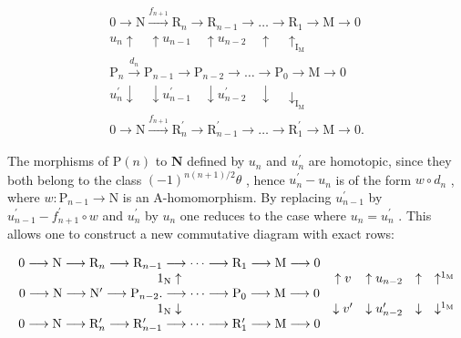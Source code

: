 \[
\begin{array}{c} 0 \longrightarrow \mathrm{N} \xrightarrow {f _ {n + 1}} \mathrm{R} _ {n} \longrightarrow \mathrm{R} _ {n - 1} \longrightarrow \dots \longrightarrow \mathrm{R} _ {1} \longrightarrow \mathrm{M} \longrightarrow 0 \\ u _ {n} \uparrow \quad \uparrow u _ {n - 1} \quad \uparrow u _ {n - 2} \quad \uparrow \quad \uparrow_ {\mathrm{I} _ {\mathrm{M}}} \\ \mathrm{P} _ {n} \xrightarrow {d _ {n}} \mathrm{P} _ {n - 1} \longrightarrow \mathrm{P} _ {n - 2} \longrightarrow \dots \longrightarrow \mathrm{P} _ {0} \longrightarrow \mathrm{M} \longrightarrow 0 \\ u _ {n} ^ {\prime} \downarrow \quad \downarrow u _ {n - 1} ^ {\prime} \quad \downarrow u _ {n - 2} ^ {\prime} \quad \downarrow \quad \downarrow_ {\mathrm{I} _ {\mathrm{M}}} \\ 0 \longrightarrow \mathrm{N} \xrightarrow {f _ {n + 1}} \mathrm{R} _ {n} ^ {\prime} \longrightarrow \mathrm{R} _ {n - 1} ^ {\prime} \longrightarrow \dots \longrightarrow \mathrm{R} _ {1} ^ {\prime} \longrightarrow \mathrm{M} \longrightarrow 0. \end{array}
\]

The morphisms of \(\mathrm{P}(n)\) to \(\mathbf{N}\) defined by \(u_{n}\) and \(u_{n}^{\prime}\) are homotopic, since they both belong to the class \((-1)^{n(n + 1) / 2}\theta\) , hence \(u_{n}^{\prime} - u_{n}\) is of the form \(w\circ d_n\) , where \(w:\mathrm{P}_{n - 1}\to \mathrm{N}\) is an A-homomorphism. By replacing \(u_{n - 1}^{\prime}\) by \(u_{n - 1}^{\prime} - f_{n + 1}^{\prime}\circ w\) and \(u_{n}^{\prime}\) by \(u_{n}\) one reduces to the case where \(u_{n} = u_{n}^{\prime}\) . This allows one to construct a new commutative diagram with exact rows:

\[
\begin{array}{c c c c c c c} 0 \longrightarrow \mathrm{N} \longrightarrow \mathrm{R} _ {n} \longrightarrow \mathrm{R} _ {n - 1} \longrightarrow \dots \longrightarrow \mathrm{R} _ {1} \longrightarrow \mathrm{M} \longrightarrow 0 \\ 1 _ {\mathrm{N}} \uparrow & \uparrow v & \uparrow u _ {n - 2} & \uparrow & \uparrow^ {1 _ {\mathrm{M}}} \\ 0 \longrightarrow \mathrm{N} \longrightarrow \mathrm{N} ^ {\prime} \longrightarrow \mathrm{P} _ {n - 2}. \longrightarrow \dots \longrightarrow \mathrm{P} _ {0} \longrightarrow \mathrm{M} \longrightarrow 0 \\ 1 _ {\mathrm{N}} \downarrow & \downarrow v ^ {\prime} & \downarrow u _ {n - 2} ^ {\prime} & \downarrow & \downarrow^ {1 _ {\mathrm{M}}} \\ 0 \longrightarrow \mathrm{N} \longrightarrow \mathrm{R} _ {n} ^ {\prime} \longrightarrow \mathrm{R} _ {n - 1} ^ {\prime} \longrightarrow \dots \longrightarrow \mathrm{R} _ {1} ^ {\prime} \longrightarrow \mathrm{M} \longrightarrow 0 \end{array}
\]

